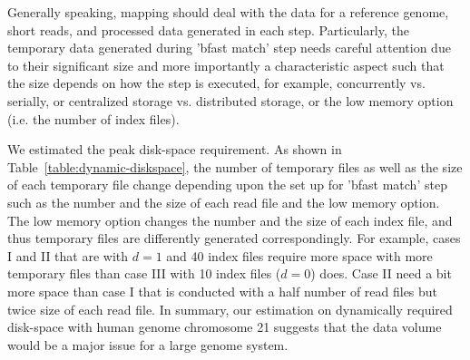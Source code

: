 \documentclass{cpeauth}
\begin{document}



Generally speaking, mapping should deal with the data for a
reference genome, short reads, and processed data generated in each
step.  Particularly, the temporary data generated during 'bfast match'
step needs careful attention due to their significant size and more
importantly a characteristic aspect such that the size depends on how
the step is executed, for example, concurrently vs. serially, or
centralized storage vs. distributed storage, or the low memory option
(i.e. the number of index files).

We estimated the peak disk-space requirement.  As shown
in Table~\ref{table:dynamic-diskspace}, the number of temporary files as
well as the size of each temporary file change depending upon the set
up for 'bfast match' step such as the number and the size of each read
file and the low memory option.  The low memory option changes the number and the size
of each index file, and thus temporary files are differently generated correspondingly.  For example, cases I and II that
are with $d=1$ and 40 index files require more space with more
temporary files than case III with 10 index files ($d=0$) does. Case
II need a bit more space than case I that is conducted with a half
number of read files but twice size of each read file.  In summary, our estimation on dynamically required disk-space with human
genome chromosome 21 suggests that the data volume would be a major
issue for a large genome system.
   
\end{document}
